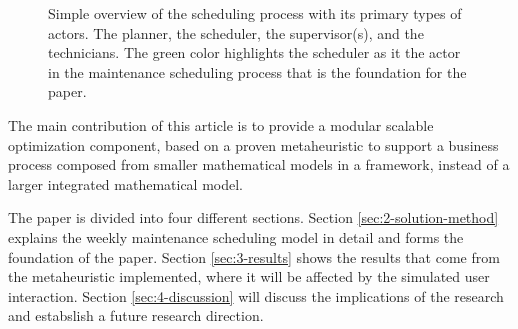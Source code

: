 \begin{figure}
	
	\caption{Simple overview of the scheduling process with its primary types of actors. The planner, the scheduler, the supervisor(s), and the technicians.
		The green color highlights the scheduler as it the actor in the maintenance scheduling process that is the foundation for the paper.}
	\label{fig:integrated:maintenance-process}
\end{figure}

The main contribution of this article is to provide a modular scalable optimization component, 
based on a proven metaheuristic to support a business process composed from smaller mathematical 
models in a framework, instead of a larger integrated mathematical model.

The paper is divided into four different sections. Section \ref{sec:2-solution-method} explains
the weekly maintenance scheduling model in detail and forms the foundation of the paper. 
Section \ref{sec:3-results} shows the results that come from the metaheuristic implemented,
where it will be affected by the simulated user interaction. Section \ref{sec:4-discussion} 
will discuss the implications of the research and estabslish a future research direction.

